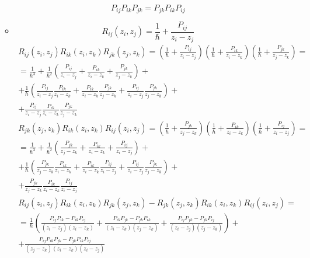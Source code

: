 \documentclass[12pt]{article}
\theoremstyle{definition}
\begin{document}
\begin{enumerate}
\begin{itemize}
\begin{equation}
            \boxed{P_{ij}P_{ik}P_{jk}=P_{jk}P_{ik}P_{ij}}
        \end{equation}
        \item
        \begin{equation}
            R_{ij}(z_i,z_j)=\frac{1}{\hbar} +\frac{P_{ij}}{z_i-z_j}
        \end{equation}
        \begin{multline}
            R_{ij} (z_i, z_j )R_{ik}(z_i, z_k)R_{jk}(z_j , z_k) =\left(\frac{1}{\hbar}+\frac{P_{ij}}{z_i-z_j}\right)\left(\frac{1}{\hbar}+\frac{P_{ik}}{z_i-z_k}\right)\left(\frac{1}{\hbar}+\frac{P_{jk}}{z_j-z_k}\right)=\\=\frac{1}{\hbar^3}+\frac{1}{\hbar^2}\left(\frac{P_{ij}}{z_i-z_j}+\frac{P_{ik}}{z_i-z_k}+\frac{P_{jk}}{z_j-z_k}\right)+\\+\frac{1}{\hbar}\left(\frac{P_{ij}}{z_i-z_j}\frac{P_{ik}}{z_i-z_k}+\frac{P_{ik}}{z_i-z_k}\frac{P_{jk}}{z_j-z_k}+\frac{P_{ij}}{z_i-z_j}\frac{P_{jk}}{z_j-z_k}\right)+\\+\frac{P_{ij}}{z_i-z_j}\frac{P_{ik}}{z_i-z_k}\frac{P_{jk}}{z_j-z_k}
        \end{multline}
        \begin{multline}
            R_{jk} (z_j, z_k )R_{ik}(z_i, z_k)R_{ij}(z_i , z_j)=\left(\frac{1}{\hbar}+\frac{P_{jk}}{z_j-z_k}\right)\left(\frac{1}{\hbar}+\frac{P_{ik}}{z_i-z_k}\right)\left(\frac{1}{\hbar}+\frac{P_{ij}}{z_i-z_j}\right)=\\=\frac{1}{\hbar^3}+\frac{1}{\hbar^2}\left(\frac{P_{jk}}{z_j-z_k}+\frac{P_{ik}}{z_i-z_k}+\frac{P_{ij}}{z_i-z_j}\right)+\\+\frac{1}{\hbar}\left(\frac{P_{jk}}{z_j-z_k}\frac{P_{ik}}{z_i-z_k}+\frac{P_{ik}}{z_i-z_k}\frac{P_{ij}}{z_i-z_j}+\frac{P_{ij}}{z_i-z_j}\frac{P_{jk}}{z_j-z_k}\right)+\\+\frac{P_{jk}}{z_j-z_k}\frac{P_{ik}}{z_i-z_k}\frac{P_{ij}}{z_i-z_j}
        \end{multline}
        \begin{multline}
            R_{ij}(z_i, z_j)R_{ik}(z_i, z_k)R_{jk}(z_j, z_k)-R_{jk} (z_j, z_k )R_{ik}(z_i, z_k)R_{ij}(z_i, z_j)=\\=\frac{1}{\hbar}\left(\frac{P_{ij}P_{ik}-P_{ik}P_{ij}}{(z_i-z_j)(z_i-z_k)}+\frac{P_{ik}P_{jk}-P_{jk}P_{ik}}{(z_i-z_k)(z_j-z_k)}+\frac{P_{ij}P_{jk}-P_{jk}P_{ij}}{(z_i-z_j)(z_j-z_k)}\right)+\\+\frac{P_{ij}P_{ik}P_{jk}-P_{jk}P_{ik}P_{ij}}{(z_j-z_k)(z_i-z_k)(z_i-z_j)}
        \end{multline}

\end{itemize}
\end{enumerate}
\end{document}
